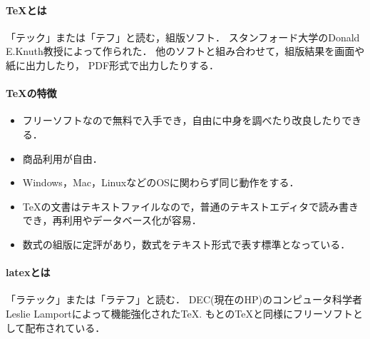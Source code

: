 \paragraph{TeXとは}
「テック」または「テフ」と読む，組版ソフト．
スタンフォード大学のDonald E.Knuth教授によって作られた．
他のソフトと組み合わせて，組版結果を画面や紙に出力したり，
PDF形式で出力したりする．

\paragraph{TeXの特徴}
\begin{itemize}
\item フリーソフトなので無料で入手でき，自由に中身を調べたり改良したりできる．
\item 商品利用が自由．
\item Windows，Mac，LinuxなどのOSに関わらず同じ動作をする．
\item TeXの文書はテキストファイルなので，普通のテキストエディタで読み書きでき，再利用やデータベース化が容易．
\item 数式の組版に定評があり，数式をテキスト形式で表す標準となっている．
\end{itemize}
\paragraph{latexとは}
「ラテック」または「ラテフ」と読む．
DEC(現在のHP)のコンピュータ科学者Leslie Lamportによって機能強化されたTeX.
もとのTeXと同様にフリーソフトとして配布されている．

